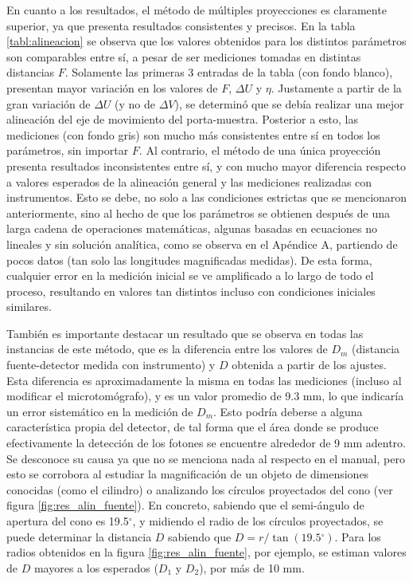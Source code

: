 En cuanto a los resultados, el método de múltiples proyecciones es claramente superior, ya que presenta
resultados consistentes y precisos. En la tabla \ref{tabl:alineacion} se observa que los valores obtenidos
para los distintos parámetros son comparables entre sí, a pesar de ser mediciones tomadas en distintas
distancias $F$. Solamente las primeras 3 entradas de la tabla (con fondo blanco), presentan mayor
variación en los valores de $F$, $\Delta U$ y $\eta$. Justamente a partir de la gran variación de $\Delta U$
(y no de $\Delta V$), se determinó que se debía realizar una mejor alineación del eje de movimiento
del porta-muestra. Posterior a esto, las mediciones (con fondo gris) son mucho más consistentes entre
sí en todos los parámetros, sin importar $F$. Al contrario, el método de una única proyección presenta
resultados inconsistentes entre sí, y con mucho mayor diferencia respecto a valores esperados de
la alineación general y las mediciones realizadas con instrumentos. Esto se debe, no solo a las condiciones
estrictas que se mencionaron anteriormente, sino al hecho de que los parámetros se obtienen después de
una larga cadena de operaciones matemáticas, algunas basadas en ecuaciones no lineales y sin solución
analítica, como se observa en el Apéndice A, partiendo de pocos datos (tan solo las longitudes magnificadas medidas). De esta forma, cualquier
error en la medición inicial se ve amplificado a lo largo de todo el proceso, resultando en valores tan
distintos incluso con condiciones iniciales similares.

También es importante destacar un resultado que se observa
en todas las instancias de este método, que es la diferencia entre los valores de $D_m$ (distancia
fuente-detector medida con instrumento) y $D$ obtenida a partir de los ajustes. Esta diferencia
es aproximadamente la misma en todas las mediciones (incluso al modificar el microtomógrafo), y es
un valor promedio de 9.3 mm, lo que indicaría un error sistemático en la medición de $D_m$. Esto
podría deberse a alguna característica propia del detector, de tal forma que el área donde se
produce efectivamente la detección de los fotones se encuentre alrededor de 9 mm adentro. Se
desconoce su causa ya que no se menciona nada al respecto en el manual, pero esto se corrobora
al estudiar la magnificación de un objeto de dimensiones conocidas (como el cilindro) o analizando
los círculos proyectados del cono (ver figura \ref{fig:res_alin_fuente}). En concreto, sabiendo que
el semi-ángulo de apertura del cono es 19.5$^{\circ}$, y midiendo el radio de los círculos proyectados,
se puede determinar la distancia $D$ sabiendo que $D = r/\tan(19.5\text{$^{\circ}$})$. Para los radios obtenidos
en la figura \ref{fig:res_alin_fuente}, por ejemplo, se estiman valores de $D$ mayores a los esperados
($D_1$ y $D_2$), por más de 10 mm.

